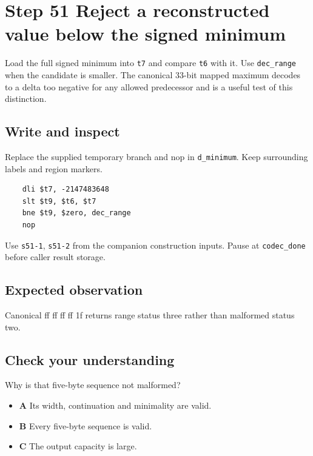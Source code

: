 \section{Step 51 Reject a reconstructed value below the signed minimum}\label{delta-s51}

Load the full signed minimum into \texttt{t7} and compare \texttt{t6} with it. Use \texttt{dec\_range} when the candidate is smaller. The canonical 33-bit mapped maximum decodes to a delta too negative for any allowed predecessor and is a useful test of this distinction.

\subsection{Write and inspect}
Replace the supplied temporary branch and nop in \texttt{d\_minimum}. Keep surrounding labels and region markers.

\begin{verbatim}
    dli $t7, -2147483648
    slt $t9, $t6, $t7
    bne $t9, $zero, dec_range
    nop
\end{verbatim}
Use \texttt{s51-1}, \texttt{s51-2} from the companion construction inputs. Pause at \texttt{codec\_done} before caller result storage.

\subsection{Expected observation}
Canonical ff ff ff ff 1f returns range status three rather than malformed status two.

\subsection{Check your understanding}
Why is that five-byte sequence not malformed?

\begin{itemize}
  \item \textbf{A} Its width, continuation and minimality are valid.
  \item \textbf{B} Every five-byte sequence is valid.
  \item \textbf{C} The output capacity is large.
\end{itemize}
